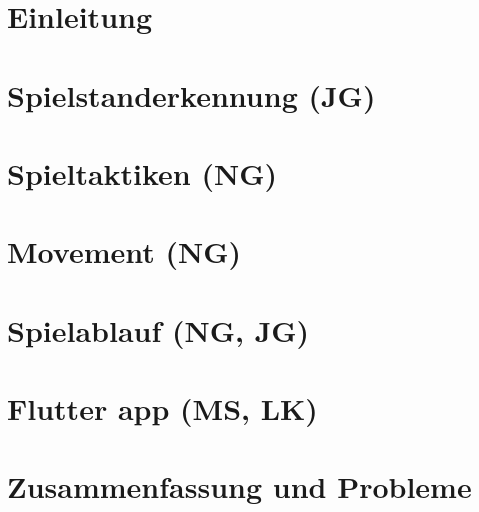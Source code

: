 \documentclass[12pt,a4paper,DIV13,pdftex,BCOR10mm,fleqn,liststotoc,bibtotoc,cleardoubleempty]{scrbook}
\begin{document}
\mainmatter
\chapter{Einleitung}

\newpage

\chapter{Spielstanderkennung (JG)}

\newpage

\newpage

\newpage
\chapter{Spieltaktiken (NG)}


\newpage
\chapter{Movement (NG)}

\newpage
\chapter{Spielablauf (NG, JG)}

\newpage
\chapter{Flutter app (MS, LK)}

\chapter{Zusammenfassung und Probleme}

\backmatter

\nocite{*}

\end{document}
